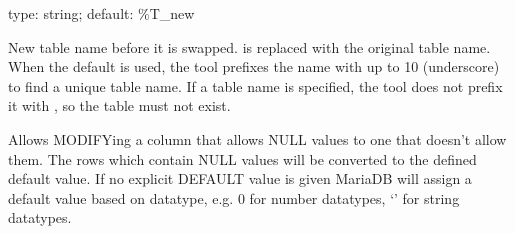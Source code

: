 \documentclass[letterpaper,10pt,english]{sphinxmanual}
\begin{document}
\begin{fulllineitems}
\label{\detokenize{mariadb-schema-change:cmdoption-mariadb-schema-change-new-table-name}}
type: string; default: \%T\_new

New table name before it is swapped.   is replaced with the original
table name.  When the default is used, the tool prefixes the name with up
to 10 \sphinxcode{\sphinxupquote{\_}} (underscore) to find a unique table name.  If a table name is
specified, the tool does not prefix it with \sphinxcode{\sphinxupquote{\_}}, so the table must not
exist.

\end{fulllineitems}


\begin{fulllineitems}
\label{\detokenize{mariadb-schema-change:cmdoption-mariadb-schema-change-null-to-not-null}}
Allows MODIFYing a column that allows NULL values to one that doesn’t allow
them. The rows which contain NULL values will be converted to the defined
default value. If no explicit DEFAULT value is given MariaDB will assign a default
value based on datatype, e.g. 0 for number datatypes, ‘’ for string datatypes.

\end{fulllineitems}

\end{document}
